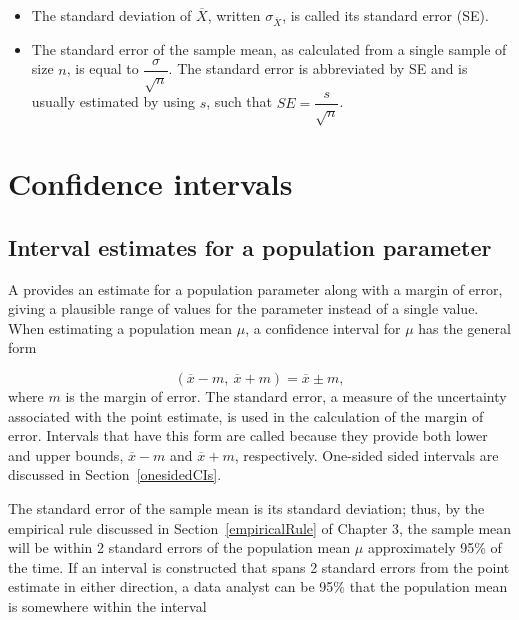 \begin{spacing}{1.5}
\begin{itemize}
	\item  The standard deviation of $\overline{X}$, written $\sigma_{\overline{X}}$, is called its standard error (SE). 
	
	\item The standard error of the sample mean, as calculated from a single sample of size $n$, is equal to $\dfrac{\sigma}{\sqrt{n}}$. The standard error is abbreviated by SE and is usually estimated by using $s$, such that $SE = \dfrac{s}{\sqrt{n}}$.
	
\end{itemize}


\section[Confidence intervals]{Confidence intervals} %
\label{confidenceIntervals}
\subsection{Interval estimates for a population parameter}

A  provides an estimate for a population parameter along with a margin of error, giving a plausible range of values for the parameter instead of a single value. When estimating a population mean $\mu$, a confidence interval for $\mu$ has the general form

\[(\overline{x} -m, \ \overline{x} + m) = \overline{x} \pm m, \]
where $m$ is the margin of error. The standard error, a measure of the uncertainty associated with the point estimate, is used in the calculation of the margin of error. Intervals that have this form are called  because they provide both lower and upper bounds, $\overline{x} - m$ and $\overline{x} + m$, respectively. One-sided sided intervals are discussed in Section~\ref{onesidedCIs}.


The standard error of the sample mean is its standard deviation; thus, by the empirical rule discussed in Section~\ref{empiricalRule} of Chapter 3, the sample mean will be within 2 standard errors of the population mean $\mu$ approximately 95\% of the time. If an interval is constructed that spans 2 standard errors from the point estimate in either direction, a data analyst can be 95\%  that the population mean is somewhere within the interval


\end{spacing}
